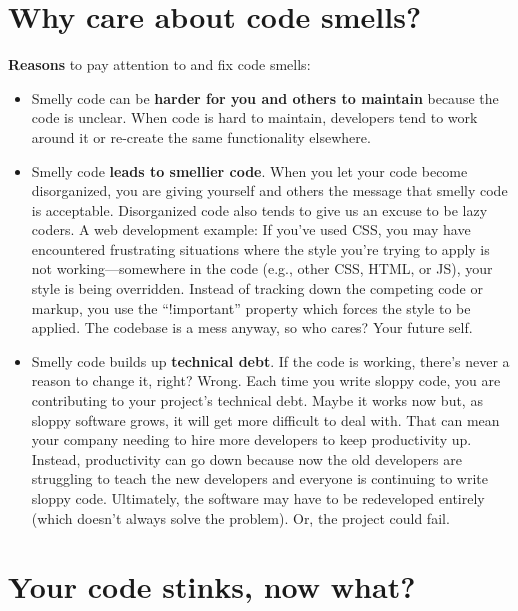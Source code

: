 \section{Why care about code smells?}

\textbf{Reasons} to pay attention to and fix code smells:\\

\begin{itemize}
\item Smelly code can be \textbf{harder for you and others to maintain} because the code is unclear. When code is hard to maintain, developers tend to work around it or re-create the same functionality elsewhere.\\
\item Smelly code \textbf{leads to smellier code}. When you let your code become disorganized, you are giving yourself and others the message that smelly code is acceptable. Disorganized code also tends to give us an excuse to be lazy coders. A web development example: If you've used CSS, you may have encountered frustrating situations where the style you're trying to apply is not working---somewhere in the code (e.g., other CSS, HTML, or JS), your style is being overridden. Instead of tracking down the competing code or markup, you use the ``!important'' property which forces the style to be applied. The codebase is a mess anyway, so who cares? Your future self.\\
\item Smelly code builds up \textbf{technical debt}. If the code is working, there's never a reason to change it, right? Wrong. Each time you write sloppy code, you are contributing to your project's technical debt. Maybe it works now but, as sloppy software grows, it will get more difficult to deal with. That can mean your company needing to hire more developers to keep productivity up. Instead, productivity can go down because now the old developers are struggling to teach the new developers and everyone is continuing to write sloppy code. Ultimately, the software may have to be redeveloped entirely (which doesn't always solve the problem). Or, the project could fail.
\end{itemize}

\section{Your code stinks, now what?}

